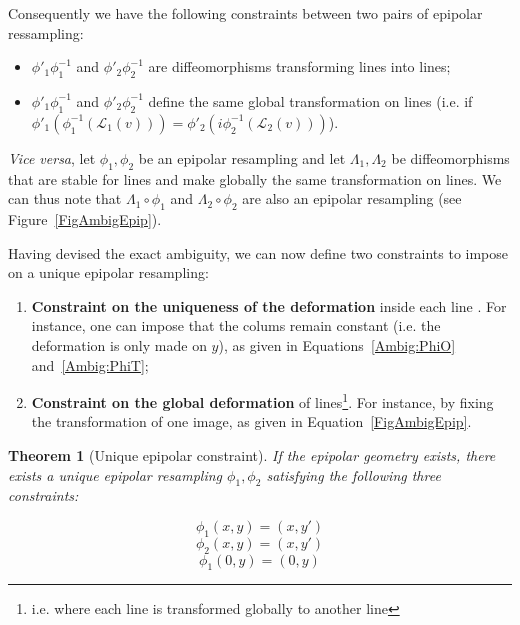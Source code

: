 \documentclass{ipol}
\newcommand{\LineE}[1]{\ensuremath{\mathcal{L}_{#1}}}
\newcommand{\LineO}{\LineE{1}}
\newcommand{\LineT}{\LineE{2}}
\newcommand{\LineK}{\LineE{k}}
\newcommand{\CurveE}[1]{\ensuremath{\mathcal{C}_{#1}}}
\newcommand{\CurveO}{\CurveE{1}}
\newcommand{\CurveT}{\CurveE{2}}
\newcommand{\CurveK}{\CurveE{k}}
\newtheorem{theorem}{Theorem}
\begin{document}
Consequently we have the following constraints between two pairs of epipolar ressampling:

\begin{itemize}
   \item  $\phi'_1 \phi_1^{-1}$  and $\phi'_2 \phi_2^{-1}$ are diffeomorphisms transforming lines into lines;
   \item $\phi'_1 \phi_1^{-1}$  and $\phi'_2 \phi_2^{-1}$ define the same global transformation on lines
        (i.e. if $\phi'_1 (\phi_1^{-1} (\LineO(v))) = \phi'_2 (i\phi_2^{-1}(\LineT(v)))$).
\end{itemize}



\emph{Vice versa}, let  $\phi_1,\phi_2$ be an epipolar resampling and let $\Lambda_1,\Lambda_2$ 
be diffeomorphisms  that are stable for lines and make globally the same transformation on lines. We can thus note that $\Lambda_1 \circ \phi_1$ and  $\Lambda_2 \circ \phi_2$ are also an epipolar resampling (see Figure~\ref{FigAmbigEpip}).


Having devised the exact ambiguity, we can now define two constraints to impose on a unique epipolar resampling: 
\begin{enumerate}
\item \textbf{Constraint on the uniqueness of the deformation}
inside each line . For instance, one can impose that the colums remain constant (i.e.
the deformation is only made  on  $y$), as given in Equations~\eqref{Ambig:PhiO}
and~\eqref{Ambig:PhiT};
\item \textbf{Constraint on the global deformation} of lines\footnote{i.e. where each line
is transformed globally to another line}. For instance, by fixing the transformation of one image, as given in Equation~\eqref{FigAmbigEpip}.
\end{enumerate}
 

\begin{theorem}[Unique epipolar constraint]

If the epipolar geometry exists, there exists a unique epipolar resampling $\phi_1,\phi_2$ satisfying the  following three constraints:

\begin{equation}
    \phi_1(x,y) = (x,y') \label{Ambig:PhiO}
\end{equation}
\begin{equation}
    \phi_2(x,y) = (x,y') \label{Ambig:PhiT}
\end{equation}
\begin{equation}
    \phi_1(0,y) = (0,y) \label{Ambig:Line}
\end{equation}
\label{Theo:Fix:Ambig}

\end{theorem}
\end{document}
